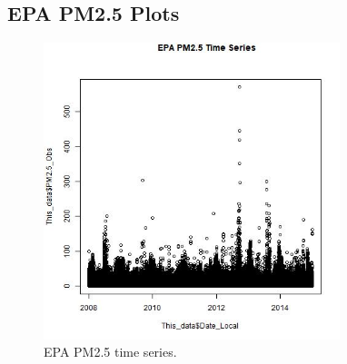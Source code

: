 
\subsection*{EPA PM2.5 Plots}
\begin{figure} 
\centering 
\includegraphics[width=0.77\textwidth]{Code_Outputs/EPA_PM25_time_series.jpg} 
\caption{\label{fig:EPA_PM25TS}EPA PM2.5 time series.} 
\end{figure} 
 
